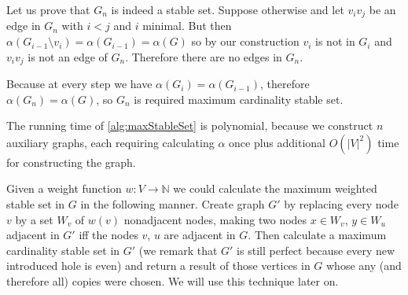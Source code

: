 Let us prove that $G_n$ is indeed a stable set. Suppose otherwise and let $v_iv_j$ be an edge in $G_n$ with $i < j$ and $i$ minimal. But then $\alpha(G_{i-1} \setminus v_i) = \alpha(G_{i-1}) = \alpha(G)$ so by our construction $v_i$ is not in $G_i$ and $v_iv_j$ is not an edge of $G_n$. Therefore there are no edges in $G_n$.

Because at every step we have $\alpha(G_i) = \alpha(G_{i-1})$, therefore $\alpha(G_n) = \alpha(G)$, so $G_n$ is required maximum cardinality stable set.

The running time of \cref{alg:maxStableSet} is polynomial, because we construct $n$ auxiliary graphs, each requiring calculating $\alpha$ once plus additional $O(|V|^2)$ time for constructing the graph.

Given a weight function $w : V \rightarrow \mathbb{N}$ we could calculate the maximum weighted stable set in $G$ in the following manner. Create graph $G'$ by replacing every node $v$ by a set $W_v$ of $w(v)$ nonadjacent nodes, making two nodes $x \in W_v$, $y \in W_u$ adjacent in $G'$ iff the nodes $v$, $u$ are adjacent in $G$. Then calculate a maximum cardinality stable set in $G'$ (we remark that $G'$ is still perfect because every new introduced hole is even) and return a result of those vertices in $G$ whose any (and therefore all) copies were chosen. We will use this technique later on.

